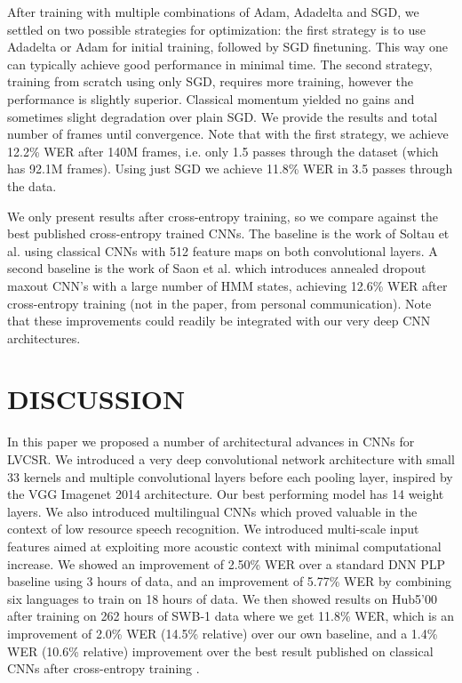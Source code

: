 \documentclass{article}
\begin{document}
After training with multiple combinations of Adam, Adadelta and SGD,
we settled on two possible strategies for optimization: the first strategy is to
use Adadelta or Adam for initial training,
followed by SGD finetuning. This way one can typically achieve good performance in minimal time.
The second strategy, training from scratch using only SGD, requires more training, 
however the performance is slightly superior.
Classical momentum yielded no gains and sometimes slight degradation over plain SGD.
We provide the results and total number of frames until convergence. 
Note that with the first strategy, we achieve 12.2\% WER
after 140M frames, i.e. only 1.5 passes through the dataset (which has 92.1M frames).
Using just SGD we achieve 11.8\% WER in 3.5 passes through the data.


We only present results after cross-entropy training, so we compare against
the best published cross-entropy trained CNNs.
The baseline is the work of Soltau et al. \cite{soltau2014joint} using
classical CNNs with 512 feature maps on both convolutional layers.
A second baseline is the work of Saon et al. \cite{saon2015ibm} which introduces
annealed dropout maxout CNN's with a large number of HMM states, achieving
12.6\% WER after cross-entropy training (not in the paper, from personal communication).
Note that these improvements could readily be integrated with our very deep CNN architectures.


\section{DISCUSSION}
In this paper we proposed a number of architectural advances in CNNs for LVCSR.
We introduced a very deep convolutional network architecture with small 33 kernels
and multiple convolutional layers before each pooling layer, inspired by the VGG Imagenet 2014 architecture.
Our best performing model has 14 weight layers.
We also introduced multilingual CNNs which proved valuable in the context
of low resource speech recognition.
We introduced multi-scale input features aimed at exploiting more acoustic context
with minimal computational increase.
We showed an improvement of 2.50\% WER over a standard DNN PLP baseline using 3 hours of data,
and an improvement of 5.77\% WER by combining six languages to train on 18 hours of data.
We then showed results on Hub5'00 after training on 262 hours of SWB-1 data where we get 
11.8\% WER, which is
an improvement of 2.0\% WER (14.5\% relative) over our own baseline, and a 
1.4\% WER (10.6\% relative) improvement over the best
result published on classical CNNs after cross-entropy training \cite{soltau2014joint}.
\end{document}
